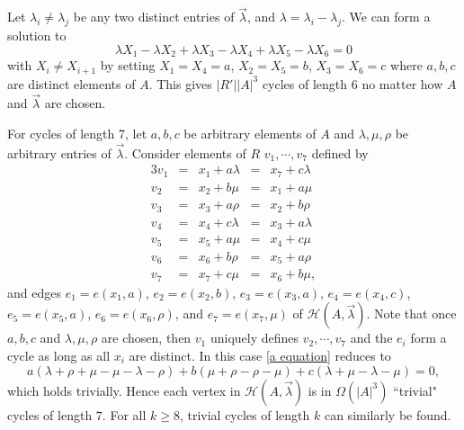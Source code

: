 \documentclass[12pt]{article}%
\def\mike#1{\noindent
\textcolor{green}
{\textsc{(Mike:}
\textsf{#1})}}
\begin{document}
 Let $\lambda_{i} \neq \lambda_{j}$ be any two distinct entries of $\vec{ \lambda}$, and $\lambda = \lambda_i - \lambda_j$.  We can form a solution to 
\[
\lambda X_1  - \lambda X_2 + \lambda X_3 
- \lambda X_4 + \lambda X_5  - \lambda X_6 = 0 
\]
with $X_i \neq X_{i+1}$ by setting $X_1 = X_4 = a$, 
$X_2 = X_5 = b$, $X_3 = X_6 = c$ where $a,b,c$ are distinct elements of $A$. This gives $|R'||A|^3$ cycles of length $6$ no matter how $A$ and $\vec{\lambda}$ are chosen.  %

For cycles of length 7, let $a,b,c$ be arbitrary elements of $A$ and $\lambda, \mu, \rho$ be arbitrary entries of $\vec{\lambda}$. Consider elements of $R$ $v_1,\cdots, v_7$ defined by 
\begin{alignat*}{3}
    v_1 & = &x_1 + a\lambda & = &x_7+c\lambda\\
    v_2 & = &x_2 + b\mu & = &x_1 + a\mu   \\
    v_3 & = &x_3 + a\rho & = &x_2 + b\rho\\
    v_4 & = &x_4 + c\lambda & = &x_3 + a\lambda\\
    v_5 & = &x_5 + a\mu & = &x_4 + c\mu \\
    v_6 & = &x_6 + b\rho & = &x_5 + a\rho \\
    v_7 & = &x_7 + c\mu  & =& x_6 + b\mu,
\end{alignat*}
and edges $e_1=e(x_1,a)$, $e_2=e(x_2, b)$, $e_3=e(x_3, a)$, $e_4=e(x_4, c)$, $e_5=e(x_5, a)$, $e_6=e(x_6, \rho)$, and $e_7=e(x_7, \mu)$ of $\mathcal{H}(A,\vec{\lambda})$. Note that once $a,b,c$ and $\lambda, \mu, \rho$ are chosen, then $v_1$ uniquely defines $v_2,\cdots, v_7$ and the $e_i$ form a cycle as long as all $x_i$ are distinct. In this case \eqref{a equation} reduces to 
\[
a(\lambda + \rho + \mu - \mu - \lambda - \rho) + b(\mu + \rho - \rho - \mu) + c(\lambda + \mu - \lambda - \mu) = 0,
\]
which holds trivially. Hence each vertex in $\mathcal{H}(A, \vec{\lambda})$ is in $\Omega(|A|^3)$ ``trivial" cycles of length $7$. For all $k\geq 8$, trivial cycles of length $k$ can similarly be found. 
\end{document}
